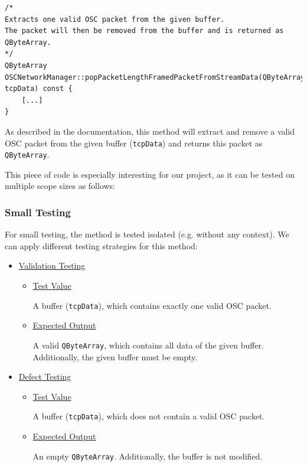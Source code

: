 \documentclass{scrreprt}
\begin{document}
\begin{lstlisting}[title=src/OSCNetworkManager.cpp]
/*
Extracts one valid OSC packet from the given buffer. 
The packet will then be removed from the buffer and is returned as QByteArray.
*/
QByteArray OSCNetworkManager::popPacketLengthFramedPacketFromStreamData(QByteArray& tcpData) const {
	[...]
}
\end{lstlisting}
\bigskip

As described in the documentation, this method will extract and remove a valid OSC packet from the given buffer (\texttt{tcpData}) and returns this packet as \texttt{QByteArray}.

This piece of code is especially interesting for our project, as it can be tested on multiple scope sizes as follows:

\subsubsection{Small Testing}

For small testing, the method is tested isolated (e.g. without any context). We can apply different testing strategies for this method:

\begin{itemize}
	\item[] \underline{Validation Testing}
	
	\begin{itemize}
		\item[] \underline{Test Value}
		
		A buffer (\texttt{tcpData}), which contains exactly one valid OSC packet.
		
		\item[] \underline{Expected Output}
		
		A valid \texttt{QByteArray}, which contains all data of the given buffer. Additionally, the given buffer must be empty.
	\end{itemize}

	\item[] \underline{Defect Testing}
	
	\begin{itemize}
		\item[] \underline{Test Value}
		
		A buffer (\texttt{tcpData}), which does not contain a valid OSC packet.
		
		\item[] \underline{Expected Output}
		
		An empty \texttt{QByteArray}. Additionally, the buffer is not modified.
	\end{itemize}
\end{itemize}
\end{document}
